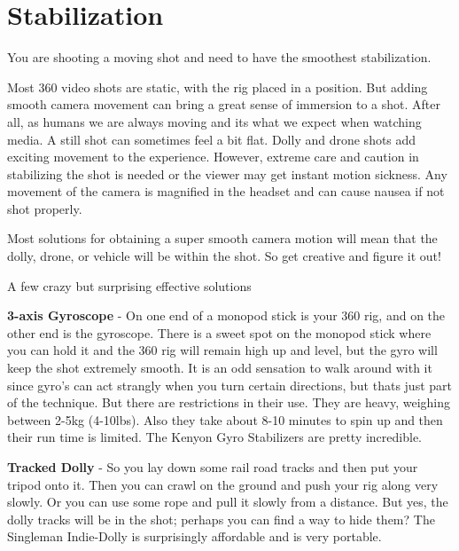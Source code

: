 \chapter{Stabilization}
\pagecolor{white}
\label{chap:24}
\begin{fullwidth}


\problem

{\large You are shooting a moving shot and need to have the smoothest stabilization. \par}

Most 360 video shots are static, with the rig placed in a position. But adding smooth camera movement can bring a great sense of immersion to a shot. After all, as humans we are always moving and its what we expect when watching media. A still shot can sometimes feel a bit flat. Dolly and drone shots add exciting movement to the experience. However, extreme care and caution in stabilizing the shot is needed or the viewer may get instant motion sickness. Any movement of the camera is magnified in the headset and can cause nausea if not shot properly.


\solution

Most solutions for obtaining a super smooth camera motion will mean that the dolly, drone, or vehicle will be within the shot. So get creative and figure it out!

{\large A few crazy but surprising effective solutions \par}
{\bf 3-axis Gyroscope} - On one end of a monopod stick is your 360 rig, and on the other end is the gyroscope. There is a sweet spot on the monopod stick where you can hold it and the 360 rig will remain high up and level, but the gyro will keep the shot extremely smooth. It is an odd sensation to walk around with it since gyro's can act strangly when you turn certain directions, but thats just part of the technique. But there are restrictions in their use. They are heavy, weighing between 2-5kg (4-10lbs). Also they take about 8-10 minutes to spin up and then their run time is limited. The Kenyon Gyro Stabilizers are pretty incredible.

{\bf Tracked Dolly} - So you lay down some rail road tracks and then put your tripod onto it. Then you can crawl on the ground and push your rig along very slowly. Or you can use some rope and pull it slowly from a distance. But yes, the dolly tracks will be in the shot; perhaps you can find a way to hide them? The Singleman Indie-Dolly is surprisingly affordable and is very portable. 


\end{fullwidth}
